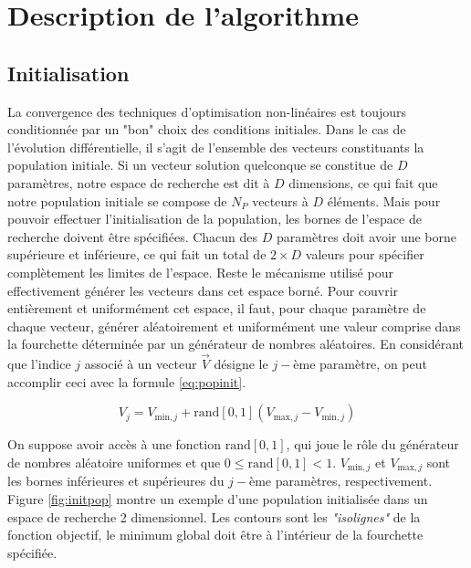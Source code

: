\section{Description de l'algorithme}

\subsection{Initialisation}

La convergence des techniques d'optimisation non-linéaires est toujours conditionnée par un "bon" choix des conditions initiales. Dans le cas de l'évolution différentielle, il s'agit de l'ensemble des vecteurs constituants la population initiale. Si un vecteur solution quelconque se constitue de $D$ paramètres, notre espace de recherche est dit à $D$ dimensions, ce qui fait que notre population initiale se compose de $N_P$ vecteurs à $D$ éléments. Mais pour pouvoir effectuer l'initialisation de la population, les bornes de l'espace de recherche doivent être spécifiées. Chacun des $D$ paramètres doit avoir une borne supérieure et inférieure, ce qui fait un total de $2 \times D$ valeurs pour spécifier complètement les limites de l'espace. Reste le mécanisme utilisé pour effectivement générer les vecteurs dans cet espace borné. Pour couvrir entièrement et uniformément cet espace, il faut, pour chaque paramètre de chaque vecteur, générer aléatoirement et uniformément une valeur comprise dans la fourchette déterminée par un générateur de nombres aléatoires. En considérant que l'indice $j$ associé à un vecteur $\vec{V}$ désigne le $j-$ème paramètre, on peut accomplir ceci avec la formule \ref{eq:popinit}. 

\begin{equation}
  \label{eq:popinit}
  V_j = V_{\text{min},j} + \text{rand}[0, 1](V_{\text{max},j} - V_{\text{min},j})
\end{equation} 

On suppose avoir accès à une fonction $\text{rand}[0, 1]$, qui joue le rôle du générateur de nombres aléatoire uniformes et que $0 \leq \text{rand}[0, 1] < 1$. 
$V_{\text{min},j}$ et $V_{\text{max},j}$ sont les bornes inférieures   et supérieures du $j-$ème paramètres, respectivement. Figure \ref{fig:initpop} montre un exemple d'une population initialisée dans un espace de recherche 2 dimensionnel. Les contours sont les \textit{"isolignes"} de la fonction objectif, le minimum global doit être à l'intérieur de la fourchette spécifiée. 

